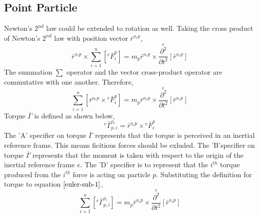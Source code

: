 \documentclass[class=report, 12pt, crop=false]{standalone}
\begin{document}
\begin{center}
\subsection{Point Particle}
\begin{comment}
\end{comment}
Newton's $2^{nd}$ law could be extended to rotation as well. Taking the cross product of Newton's $2^{nd}$ law with position vector $\bar{r}^{o_{e}p}$,
$$\bar{r}^{o_{e}p}\times\sum^{n}_{i = 1}\left[{}^{e}\bar{F}^{p}_{i}\right] = m_{p}\bar{r}^{o_{e}p}\times\overset{e}{\frac{\partial^{2}}{\partial t^{2}}}[\bar{r}^{o_{e}p}]$$
The summation $\displaystyle\sum$ operator and the vector cross-product operator are commutative with one another. Therefore,
\begin{equation}\sum^{n}_{i = 1}\left[\bar{r}^{o_{e}p}\times{}^{e}\bar{F}^{p}_{i}\right] = m_{p}\bar{r}^{o_{e}p}\times\overset{e}{\frac{\partial^{2}}{\partial t^{2}}}[\bar{r}^{o_{e}p}]\label{euler-sub-1}\end{equation}
Torque $\bar{\Gamma}$ is defined as shown below,
\begin{equation}{}^{e}\bar{\Gamma}^{o_{e}}_{p,i} = \bar{r}^{o_{e}p}\times{}^{e}\bar{F}^{p}_{i}\label{torque-definition}\end{equation}
The 'A' specifier on torque $\bar{\Gamma}$ represents that the torque is perceived in an inertial reference frame. This means ficitious forces should be exluded. The 'B'specifier on torque $\bar{\Gamma}$ represents that the moment is taken with respect to the origin of the inertial reference frame $e$. The 'D' specifier is to represent that the $i^{th}$ torque produced from the $i^{th}$ force is acting on particle $p$. Substituting the definition for torque to equation $\ref{euler-sub-1}$,
\begin{equation}\sum^{n}_{i = 1}\left[{}^{e}\bar{\Gamma}^{o_{e}}_{p,i}\right] = m_{p}\bar{r}^{o_{e}p}\times\overset{e}{\frac{\partial^{2}}{\partial t^{2}}}[\bar{r}^{o_{e}p}]\label{euler-sub-2}\end{equation}


\end{center}
\end{document}
